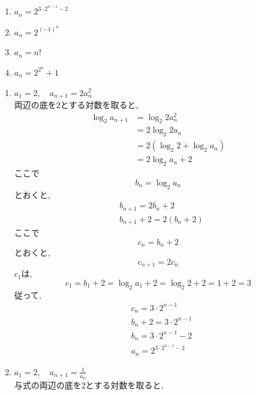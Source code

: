   \noindent{}
  \begin{enumerate}[label=(\arabic*),parsep=3pt,format=\bookitemlink{example-logarithmic-1}{answer}{problem}]
    \item $\displaystyle a_n=2^{3\cdot2^{n-1}-2}$
    \item $a_n=2^{(-1)^{n}}$
    \item $a_n=n!$
    \item $a_n=2^{2^n}+1$
  \end{enumerate}

  \noindent{}
  \begin{enumerate}[label=(\arabic*),parsep=3pt,format=\bookitemlink{example-logarithmic-1}{solution}{problem}]
    \item $\displaystyle a_1=2,\quad a_{n+1}=2a_n^2$\\
          両辺の底を$2$とする対数を取ると,
          \begin{align*}
            \log_2a_{n+1}
              &=\log_2{2a_n^2}\\
              &=2\log_2{2a_n}\\
              &=2(\log_2{2}+\log_2{a_n})\\
              &=2\log_2{a_n}+2
          \end{align*}
          ここで
          \[
            b_n=\log_2a_n
          \]
          とおくと,
          \begin{align*}
            &b_{n+1}=2b_n+2\\
            &b_{n+1}+2=2(b_n+2)
          \end{align*}
          ここで
          \[
            c_n=b_n+2
          \]
          とおくと,
          \[
            c_{n+1}=2c_n
          \]
          $c_1$は,
          \[
            c_1=b_1+2=\log_2{a_1}+2=\log_2{2}+2=1+2=3
          \]
          従って,
          \begin{align*}
            &c_n=3\cdot2^{n-1}\\
            &b_n+2=3\cdot2^{n-1}\\
            &b_n=3\cdot2^{n-1}-2\\
            &a_n=2^{3\cdot2^{n-1}-2}
          \end{align*}
    \item $\displaystyle a_1=2,\quad a_{n+1}=\frac{1}{a_n}$\\
          与式の両辺の底を2とする対数を取ると,
          \begin{align*}

\end{align*}
\end{enumerate}
